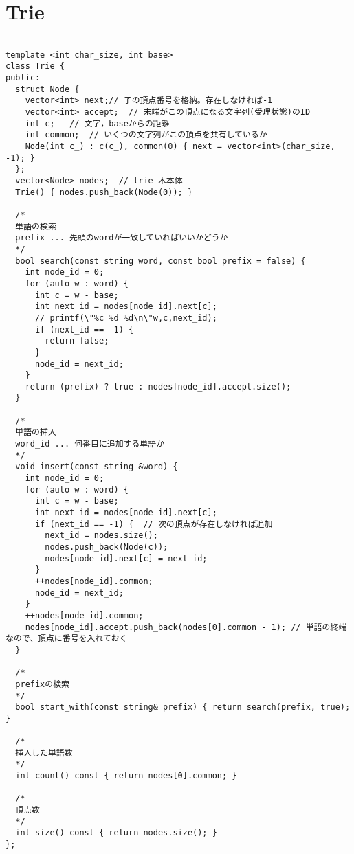 \documentclass[a4j,titlepage]{jarticle} %
\begin{document}
\section{Trie}
\color{black}
\begin{lstlisting}[caption=Trie]

template <int char_size, int base>
class Trie {
public:
  struct Node {
    vector<int> next;// 子の頂点番号を格納。存在しなければ-1
    vector<int> accept;  // 末端がこの頂点になる文字列(受理状態)のID
    int c;   // 文字，baseからの距離
    int common;  // いくつの文字列がこの頂点を共有しているか
    Node(int c_) : c(c_), common(0) { next = vector<int>(char_size, -1); }
  };
  vector<Node> nodes;  // trie 木本体
  Trie() { nodes.push_back(Node(0)); }

  /*
  単語の検索
  prefix ... 先頭のwordが一致していればいいかどうか
  */
  bool search(const string word, const bool prefix = false) {
    int node_id = 0;
    for (auto w : word) {
      int c = w - base;
      int next_id = nodes[node_id].next[c];
      // printf(\"%c %d %d\n\"w,c,next_id);
      if (next_id == -1) {
        return false;
      }
      node_id = next_id;
    }
    return (prefix) ? true : nodes[node_id].accept.size();
  }

  /*
  単語の挿入
  word_id ... 何番目に追加する単語か
  */
  void insert(const string &word) {
    int node_id = 0;
    for (auto w : word) {
      int c = w - base;
      int next_id = nodes[node_id].next[c];
      if (next_id == -1) {  // 次の頂点が存在しなければ追加
        next_id = nodes.size();
        nodes.push_back(Node(c));
        nodes[node_id].next[c] = next_id;
      }
      ++nodes[node_id].common;
      node_id = next_id;
    }
    ++nodes[node_id].common;
    nodes[node_id].accept.push_back(nodes[0].common - 1); // 単語の終端なので、頂点に番号を入れておく
  }

  /*
  prefixの検索
  */
  bool start_with(const string& prefix) { return search(prefix, true); }

  /*
  挿入した単語数
  */
  int count() const { return nodes[0].common; }

  /*
  頂点数
  */
  int size() const { return nodes.size(); }
};

\end{lstlisting}

\color{white}
\end{document}
